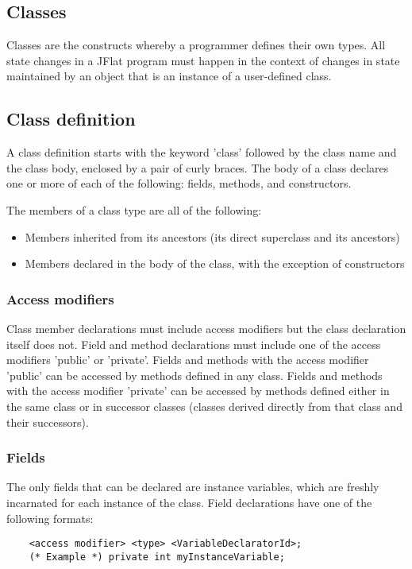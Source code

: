\begin{homeworkProblem}
	\chapter{Classes}
	
	Classes are the constructs whereby a programmer defines their own types. All state changes in a JFlat program must happen in the context of changes in state maintained by an object that is an instance of a user-defined class.
	
	\section{Class definition}
	A class definition starts with the keyword 'class' followed by the class name and the class body, enclosed by a pair of curly braces. The body of a class declares one or more of each of the following: fields, methods, and constructors.
	
	The members of a class type are all of the following:
	\begin{itemize}
		\item Members inherited from its ancestors (its direct superclass and its ancestors)
		\item Members declared in the body of the class, with the exception of constructors
	\end{itemize}
	
	\subsection{Access modifiers}
	Class member declarations must include access modifiers but the class declaration itself does not. Field and method declarations must include one of the access modifiers 'public' or 'private'. Fields and methods with the access modifier 'public' can be accessed by methods defined in any class. Fields and methods with the access modifier 'private' can be accessed by methods defined either in the same class or in successor classes (classes derived directly from that class and their successors).
	
	\subsection{Fields}
	The only fields that can be declared are instance variables, which are freshly incarnated for each instance of the class.
	Field declarations have one of the following formats:
	\begin{verbatim}
	<access modifier> <type> <VariableDeclaratorId>;
	(* Example *) private int myInstanceVariable;
	

\end{verbatim}
\end{homeworkProblem}
